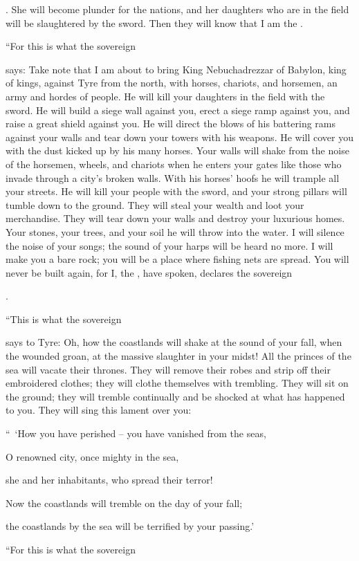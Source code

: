 {{}. She will become
plunder
for the nations,
and her daughters
who
are in the field
will be slaughtered
by the sword.
Then they will know
that
I am
the {}.
\par }{\PP {}“For
this is what
the sovereign

{}
says: Take note
that I am about
to bring
King
Nebuchadrezzar
of Babylon,
king
of kings,
against Tyre
from the north,
with horses,
chariots,
and horsemen,
an army
and hordes
of people.
He will kill
your daughters
in the field
with the sword.
He will
build a siege
wall against
you, erect
a siege
ramp
against you, and raise
a great shield against you.
He will direct
the blows
of his battering rams
against your walls
and tear down
your towers
with his weapons.
He will cover
you with the dust
kicked up by his many horses.
Your walls
will shake
from the noise
of the horsemen,
wheels,
and chariots
when he enters
your gates
like those who invade
through a city’s
broken walls.
With
his horses’
hoofs
he will trample
all
your streets.
He will kill
your people
with the sword,
and your strong
pillars
will tumble down
to the ground.
They
will steal
your wealth
and loot
your merchandise.
They will tear
down your walls
and destroy your luxurious homes.
Your stones,
your trees,
and your soil
he will throw into
the water.
I will silence
the noise
of your songs;
the sound
of your harps
will be heard
no
more.
I will make
you a bare
rock;
you will be a place where fishing
nets
are spread.
You will
never
be
built
again,
for
I,
the
{},
have spoken,
declares
the sovereign

{}.
\par }{\PP {}“This is what the sovereign

{}
says
to Tyre: Oh, how the coastlands
will shake
at the sound
of your fall,
when the wounded
groan,
at the massive
slaughter
in your midst!
All
the princes
of the sea
will vacate
their thrones.
They will remove
their robes
and
strip
off their embroidered
clothes;
they will clothe
themselves with trembling.
They will sit
on
the ground;
they will tremble
continually
and be shocked at what has happened to you.
They will sing this lament
over
you:

\par }{\Q “ ‘How
you have perished
– you have
vanished
from the seas,
\par }{\Q O renowned
city,
once mighty
in the sea,
\par }{\Q she
and her
inhabitants,
who spread
their terror!
\par }{\Q {}Now
the coastlands
will tremble
on the day
of your fall;
\par }{\Q the coastlands
by the sea
will be terrified
by your passing.’
\par }{\PP {}“For
this is what
the sovereign

}
